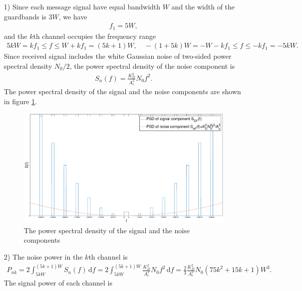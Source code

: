 \documentclass{assignment}
\begin{document}
\begin{sol}
    \begin{itemize}
        \item[1)] Since each message signal have equal bandwidth $W$ and the width of the guardbands is $3W$, we have
        \begin{align}
            f_1=5W,
        \end{align}
        and the $k$th channel occupies the frequency range
        \begin{align}
            5kW=kf_1\leq f\leq W+kf_1=(5k+1)W,\quad -(1+5k)W=-W-kf_1\leq f\leq-kf_1=-5kW.
        \end{align}
        Since received signal includes the white Gaussian noise of two-sided power spectral density $N_0/2$, the power spectral density of the noise component is
        \begin{align}
            S_n(f)=\frac{K_D^2}{A_c^2}N_0f^2.
        \end{align}
        The power spectral density of the signal and the noise components are shown in figure \ref{A-6-P-4}.
        \begin{figure}[h]
            \centering
            \includegraphics[width=1\columnwidth]{A-6-P-4.eps}
            \caption{The power spectral density of the signal and the noise components}
            \label{A-6-P-4}
        \end{figure}
        \item[2)] The noise power in the $k$th channel is
        \begin{align}
            P_{nk}=2\int_{5kW}^{(5k+1)W}S_n(f)\,\mathrm{d}f=2\int_{5kW}^{(5k+1)W}\frac{K_D^2}{A_c^2}N_0f^2\,\mathrm{d}f=\frac{2}{3}\frac{K_D^2}{A_c^2}N_0(75k^2+15k+1)W^3.
        \end{align}
        The signal power of each channel is
        \begin{align}

\end{align}
\end{itemize}
\end{sol}
\end{document}
